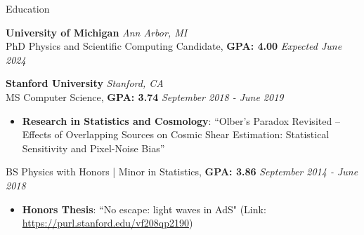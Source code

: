 \begin{rSection}{Education}

{\bf University of Michigan} \hfill {\em Ann Arbor, MI} 
\\ PhD Physics and Scientific Computing Candidate, \textbf{GPA: 4.00} \hfill {\em Expected June 2024}
\vspace*{-0.1cm}
%

{\bf Stanford University} \hfill {\em Stanford, CA} 
\\ MS Computer Science, \textbf{GPA: 3.74} \hfill {\em September 2018 - June 2019}

\vspace*{-0.1cm}
%
\begin{itemize}[itemsep=-0.3em] %

    \item 
    \textbf{Research in Statistics and Cosmology}: ``Olber’s Paradox Revisited – Effects of Overlapping Sources on Cosmic Shear Estimation:  Statistical Sensitivity and Pixel-Noise Bias''
\end{itemize}

%
BS Physics with Honors | Minor in Statistics, \textbf{GPA: 3.86} \hfill {\em September 2014 - June 2018}
%
\vspace*{-0.1cm}
\begin{itemize}[itemsep=-0.25em] 

    \item 
    \textbf{Honors Thesis}: ``No escape: light waves in AdS" (Link: \url{https://purl.stanford.edu/vf208qp2190})  

\end{itemize}
%
\vspace*{-0.1cm}
\end{rSection}


